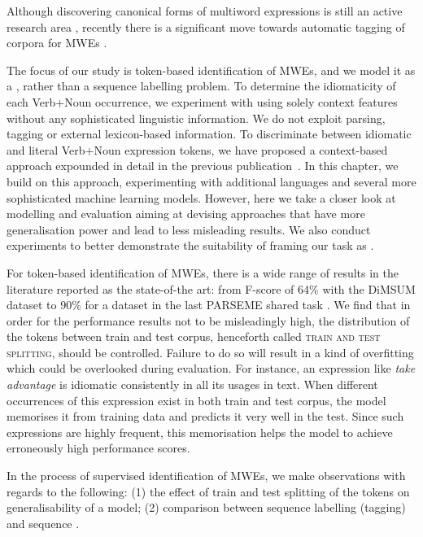 \documentclass[output=paper
,modfonts
,nonflat]{langsci/langscibook}
\begin{document}
Although discovering canonical forms of multiword expressions is still an active research area \citep{salehi2013, farahmand2014}, recently there is a significant move towards automatic tagging of corpora for MWEs \citep{Schneider14b,constant2012evaluating}.

The focus of our study is token-based identification of MWEs, and we model it as a , rather than a sequence labelling problem.
To determine the idiomaticity of each Verb+Noun occurrence, we experiment with using solely context features without any sophisticated linguistic information. We do not exploit parsing, tagging or external lexicon-based information.
To discriminate between idiomatic and literal Verb+Noun expression tokens, we have proposed a context-based  approach expounded in detail in the previous publication~\citep{taslimipoor2017}. In this chapter, we build on this approach, experimenting with additional languages and several more sophisticated machine learning models. However, here we take a closer look at modelling and evaluation aiming at devising approaches that have more generalisation power and lead to less misleading results. We also conduct experiments to better demonstrate the suitability of framing our task as .

For token-based identification of MWEs, there is a wide range of results in the literature reported as the state-of-the art: from F-score of 64\% with the DiMSUM dataset \citep{schneider-dimsum:2016} to 90\% \citep{W17-1717} for a dataset in the last PARSEME shared task \citep{MWEWorkshop}.
We find that in order for the performance results not to be misleadingly high, the distribution of the tokens between train and test corpus, henceforth called \textsc{train and test splitting}, should be controlled. Failure to do so will result in a kind of overfitting which could be overlooked during evaluation. For instance, an expression like \textit{take advantage} is idiomatic consistently in all its usages in text. When different occurrences of this expression exist in both train and test corpus, the model memorises it from training data and predicts it very well in the test. Since such expressions are highly frequent, this memorisation helps the model to achieve erroneously high performance scores.

In the process of supervised identification of MWEs, we make observations with regards to the following: (1) the effect of train and test splitting of the tokens on generalisability of a model; (2) comparison between sequence labelling (tagging) and sequence .
\end{document}
